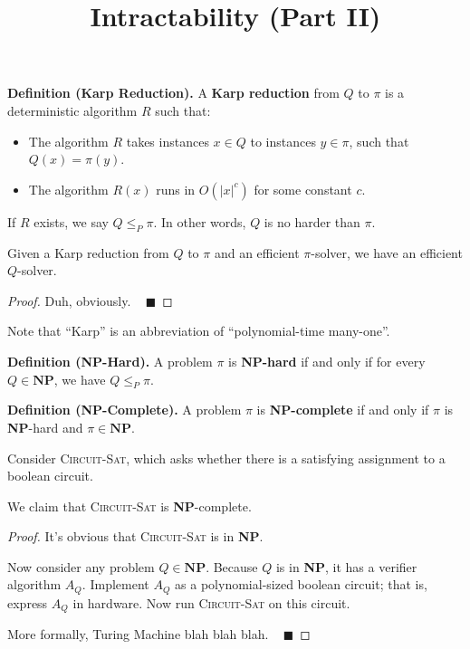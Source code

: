 \title{Intractability (Part II)}



\textbf{Definition (Karp Reduction).} A \textbf{Karp reduction} from $Q$ to $\pi$ is a deterministic algorithm $R$ such that:
\begin{itemize}
    \item The algorithm $R$ takes instances $x \in Q$ to instances $y \in \pi$, such that $Q(x) = \pi(y)$.
    \item The algorithm $R(x)$ runs in $O(|x|^c)$ for some constant $c$.
\end{itemize}
If $R$ exists, we say $Q \leq_P \pi$.  In other words, $Q$ is no harder than $\pi$.

\begin{claim}
    Given a Karp reduction from $Q$ to $\pi$ and an efficient $\pi$-solver, we have an efficient $Q$-solver.
\end{claim}

\begin{proof}
    Duh, obviously. ~ $\blacksquare$
\end{proof}

Note that ``Karp'' is an abbreviation of ``polynomial-time many-one''.

\textbf{Definition (NP-Hard).} A problem $\pi$ is \textbf{NP-hard} if and only if for every $Q \in \textbf{NP}$, we have $Q \leq_P \pi$.

\textbf{Definition (NP-Complete).} A problem $\pi$ is \textbf{NP-complete} if and only if $\pi$ is \textbf{NP}-hard and $\pi \in \textbf{NP}$.

\begin{claim}
    Consider \textsc{Circuit-Sat}, which asks whether there is a satisfying assignment to a boolean circuit.

    We claim that \textsc{Circuit-Sat} is \textbf{NP}-complete.
\end{claim}

\begin{proof}
    It's obvious that \textsc{Circuit-Sat} is in \textbf{NP}.

    Now consider any problem $Q \in \textbf{NP}$.  Because $Q$ is in \textbf{NP}, it has a verifier algorithm $A_Q$.  Implement $A_Q$ as a polynomial-sized boolean circuit; that is, express $A_Q$ in hardware.  Now run \textsc{Circuit-Sat} on  this circuit.

    More formally, Turing Machine blah blah blah. ~ $\blacksquare$
\end{proof}

